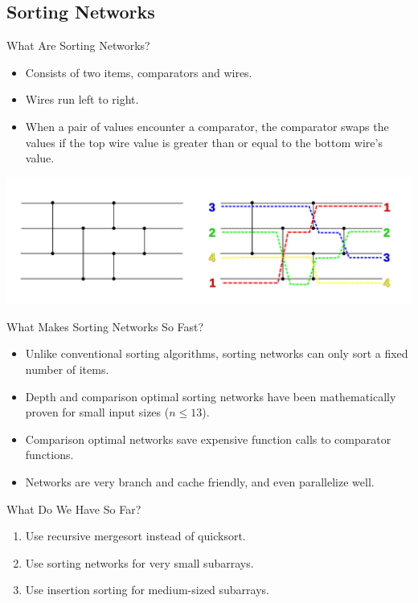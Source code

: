 \documentclass[13pt]{beamer}
\begin{document}
\subsection{Sorting Networks}
\begin{frame}{What Are Sorting Networks?}
	\begin{itemize}
		\item Consists of two items, comparators and wires.
		\item Wires run left to right.
		\item When a pair of values encounter a comparator, the comparator swaps the
		      values if the top wire value is greater than or equal to the bottom
		      wire's value.
	\end{itemize}

	\centering
	\includegraphics[width=0.8\columnwidth]{simplesortingnetwork.png}
\end{frame}

\begin{frame}{What Makes Sorting Networks So Fast?}
	\pause
	\begin{itemize}[<+->]
		\item Unlike conventional sorting algorithms, sorting networks can only
		      sort a fixed number of items.
		\item Depth and comparison optimal sorting networks have been
		      mathematically proven for small input sizes ($n \le 13$).
		\item Comparison optimal networks save expensive function calls to
		      comparator functions.
		\item Networks are very branch and cache friendly, and even parallelize
		      well.
	\end{itemize}
\end{frame}

\begin{frame}{What Do We Have So Far?}
	\begin{enumerate}
		\item Use recursive mergesort instead of quicksort.
		\item Use sorting networks for very small subarrays.
		\item Use insertion sorting for medium-sized subarrays.
	\end{enumerate}
\end{frame}
\end{document}
